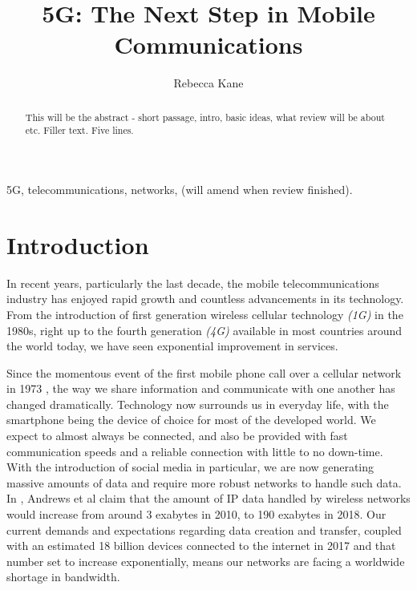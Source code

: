 \documentclass[journal]{IEEEtran}
\begin{document}
\title{5G: The Next Step in Mobile Communications}
\author{Rebecca Kane}


\maketitle

\begin{abstract}
This will be the abstract - short passage, intro, basic ideas, what review will be about etc. Filler text. Five lines.
\end{abstract}
\begin{IEEEkeywords}
5G, telecommunications, networks, (will amend when review finished).
\end{IEEEkeywords}

\section{Introduction}
In recent years, particularly the last decade, the mobile telecommunications industry has enjoyed rapid growth and countless advancements in its technology. From the introduction of first generation wireless cellular technology \textit{(1G)} in the 1980s, right up to the fourth generation \textit{(4G)} available in most countries around the world today, we have seen exponential improvement in services.

Since the momentous event of the first mobile phone call over a cellular network in 1973 \cite{tomfarhist}, the way we share information and communicate with one another has changed dramatically. Technology now surrounds us in everyday life, with the smartphone being the device of choice for most of the developed world. We expect to almost always be connected, and also be provided with fast communication speeds and a reliable connection with little to no down-time. With the introduction of social media in particular, we are now generating massive amounts of data and require more robust networks to handle such data. In \cite{whatwill5gbe}, Andrews et al claim that the amount of IP data handled by wireless networks would increase from around 3 exabytes in 2010, to 190 exabytes in 2018. Our current demands and expectations regarding data creation and transfer, coupled with an estimated 18 billion devices connected to the internet in 2017 \cite{ericssondev} and that number set to increase exponentially, means our networks are facing a worldwide shortage in bandwidth.
\end{document}
